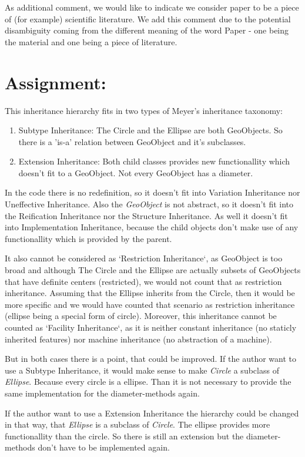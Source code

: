 \documentclass[a4paper,12pt,oneside]{scrreprt}
\begin{document}
    As additional comment, we would like to indicate we consider paper to be a piece of (for example) scientific literature. We add this comment due to the potential disambiguity coming from the different meaning of the word Paper - one being the material and one being a piece of literature. 
    
	\section{Assignment:}
    
    \begin{flushleft}
        This inheritance hierarchy fits in two types of Meyer's inheritance taxonomy:
        \begin{enumerate}
            \item Subtype Inheritance: The Circle and the Ellipse are both GeoObjects. So there is a 'is-a' relation between GeoObject and it's subclasses.
            \item Extension Inheritance: Both child classes provides new functionallity which doesn't fit to a GeoObject. Not every GeoObject has a diameter.
        \end{enumerate}
    
        In the code there is no redefinition, so it doesn't fit into Variation Inheritance nor Uneffective Inheritance. Also the \textit{GeoObject} is not abstract, so it doesn't fit into the Reification Inheritance nor the Structure Inheritance. As well it doesn't fit into Implementation Inheritance, because the child objects don't make use of any functionallity which is provided by the parent.
        
        It also cannot be considered as `Restriction Inheritance`, as GeoObject is too broad and although The Circle and the Ellipse are actually subsets of GeoObjects that have definite centers (restricted), we would not count that as restriction inheritance. Assuming that the Ellipse inherits from the Circle, then it would be more specific and we would have counted that scenario as restriction inheritance (ellipse being a special form of circle). Moreover, this inheritance cannot be counted as `Facility Inheritance`, as it is neither constant inheritance (no staticly inherited features) nor machine inheritance (no abstraction of a machine).
        
        But in both cases there is a point, that could be improved. If the author want to use a Subtype Inheritance, it would make sense to make \textit{Circle} a subclass of \textit{Ellipse}. Because every circle is a ellipse. Than it is not necessary to provide the same implementation for the diameter-methods again.
        
        If the author want to use a Extension Inheritance the hierarchy could be changed in that way, that \textit{Ellipse} is a subclass of \textit{Circle}. The ellipse provides more functionallity than the circle. So there is still an extension but the diameter-methods don't have to be implemented again.
    \end{flushleft}
	
\end{document}
